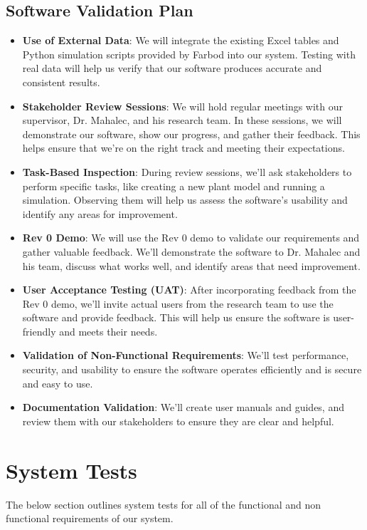 \documentclass[12pt, titlepage]{article}
\begin{document}
\subsection{Software Validation Plan}
\begin{itemize}
    \item \textbf{Use of External Data}: We will integrate the existing Excel tables and Python simulation scripts provided by Farbod into our system. Testing with real data will help us verify that our software produces accurate and consistent results.
    \item \textbf{Stakeholder Review Sessions}: We will hold regular meetings with our supervisor, Dr. Mahalec, and his research team. In these sessions, we will demonstrate our software, show our progress, and gather their feedback. This helps ensure that we're on the right track and meeting their expectations.
    \item \textbf{Task-Based Inspection}: During review sessions, we'll ask stakeholders to perform specific tasks, like creating a new plant model and running a simulation. Observing them will help us assess the software's usability and identify any areas for improvement.
    \item \textbf{Rev 0 Demo}: We will use the Rev 0 demo to validate our requirements and gather valuable feedback. We'll demonstrate the software to Dr. Mahalec and his team, discuss what works well, and identify areas that need improvement.
    \item \textbf{User Acceptance Testing (UAT)}: After incorporating feedback from the Rev 0 demo, we'll invite actual users from the research team to use the software and provide feedback. This will help us ensure the software is user-friendly and meets their needs.
    \item \textbf{Validation of Non-Functional Requirements}: We'll test performance, security, and usability to ensure the software operates efficiently and is secure and easy to use.
    \item \textbf{Documentation Validation}: We'll create user manuals and guides, and review them with our stakeholders to ensure they are clear and helpful.
\end{itemize}

\section{System Tests}
The below section outlines system tests for all of the functional and non functional requirements of our system. 
\end{document}
